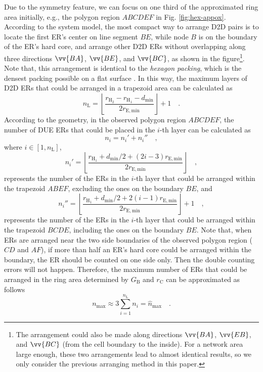 \documentclass[journal, 10pt]{IEEEtran}
\begin{document}
Due to  the symmetry feature, we can focus on one third of the approximated ring 
area initially, e.g., the polygon region $ABCDEF$ in Fig. \ref{fig:hex-appox}. 
According to the system model, the most compact way to arrange D2D pairs 
is to locate the first ER's center on line segment $BE$, while node $B$ 
is on the boundary of the ER's hard core, and arrange other D2D ERs 
without overlapping along three directions $\vv{BA}$, $\vv{BE}$, and $\vv{BC}$, 
as shown in the 
figure\footnote{The arrangement could also be made along directions
$\vv{BA}$, $\vv{EB}$, and $\vv{BC}$ (from the cell boundary to the
inside). For a network area large enough, these two arrangements lead
to almost identical results, so we only consider the previous
arranging method in this paper.}. 
Note that, this arrangement is identical to the 
\emph{hexagon packing}, which is the densest packing possible on a flat 
surface \cite{Stephenson:03circlepacking}. In this way, the maximum layers 
of D2D ERs that could be arranged in a trapezoid area can be calculated as 
\begin{equation}\label{eq:nr}
n_\mathrm{L}= \left\lfloor   
\frac{r_\mathrm{H_2} - r_\mathrm{H_1} - d_{\min}}{2r_\mathrm{E, min}}  
\right\rfloor +1 \quad.
\end{equation}
According to the geometry, in the observed polygon region $ABCDEF$, the 
number of DUE ERs that could be placed in the $i$-th layer can be calculated as
\begin{equation}
	n_i = n_i' + n_i''\quad, \label{eq:nd}
\end{equation}
where $i \in [1, n_\mathrm{L}]$,  
\begin{equation}
	n_i' = \left\lfloor   \frac{r_\mathrm{H_1} + d_{\min}/2 + (2i-3)r_\mathrm{E, min}}
	{2r_\mathrm{E, min}}\right\rfloor\quad,
\end{equation}
represents the number of the ERs in the $i$-th layer that could be
arranged within the trapezoid $ABEF$, excluding the ones on the
boundary $BE$, and
\begin{equation}
	n_i'' = \left\lfloor   \frac{r_\mathrm{H_1} + d_{\min}/2 + 2(i-1)r_\mathrm{E, min}}
	{2r_\mathrm{E, min}}\right\rfloor +1\quad,
\end{equation}
represents the number of the ERs in the $i$-th layer that could be
arranged within the trapezoid $BCDE$, including the ones on the
boundary $BE$. Note that, when ERs are arranged near the two side
boundaries of the observed polygon region ($CD$ and $AF$), if more
than half an ER's hard core could be arranged within the boundary, the
ER should be counted on one side only. Then the double counting errors
will not happen. 
Therefore, the maximum number of ERs that could be arranged in the ring 
area determined by $G_\mathrm{B}$ and $r_\mathrm{C}$ can be approximated 
as follows
\begin{equation}\label{eq:nmax}
n_{\max} \approx 3  \sum_{i =1}^{n_\mathrm{L}} n_i = \widehat{n}_{{\max}} \quad.
\end{equation}
\end{document}
